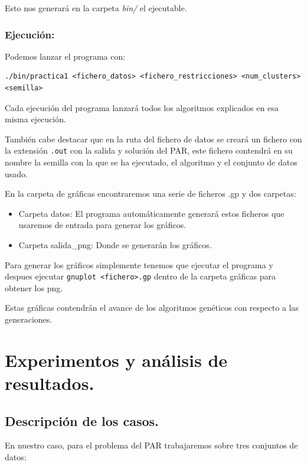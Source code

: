 \documentclass[12pt, spanish]{article}
\begin{document}
Esto nos generará en la carpeta \textit{bin/} el ejecutable.


\subsubsection{Ejecución:}

Podemos lanzar el programa con:

\begin{lstlisting}
./bin/practica1 <fichero_datos> <fichero_restricciones> <num_clusters> <semilla>
\end{lstlisting}

Cada ejecución del programa lanzará todos los algoritmos explicados en esa misma ejecución.

También cabe destacar que en la ruta del fichero de datos se creará un fichero con la extensión \texttt{.out} con la salida y solución del PAR, este fichero contendrá en su nombre la semilla con la que se ha ejecutado, el algoritmo y el conjunto de datos usado.

En la carpeta de gráficas encontraremos una serie de ficheros .gp y dos carpetas:

\begin{itemize}
	\item Carpeta datos: El programa automáticamente generará estos ficheros que usaremos de entrada para generar los gráficos.
	\item Carpeta salida\_png: Donde se generarán los gráficos.
\end{itemize}

Para generar los gráficos simplemente tenemos que ejecutar el programa y despues ejecutar \texttt{gnuplot <fichero>.gp} dentro de la carpeta gráficas para obtener los png.

Estas gráficas contendrán el avance de los algoritmos genéticos con respecto a las generaciones.

\newpage

\section{Experimentos y análisis de resultados.}


\subsection{Descripción de los casos.}

En nuestro caso, para el problema del PAR trabajaremos sobre tres conjuntos de datos:
\end{document}
